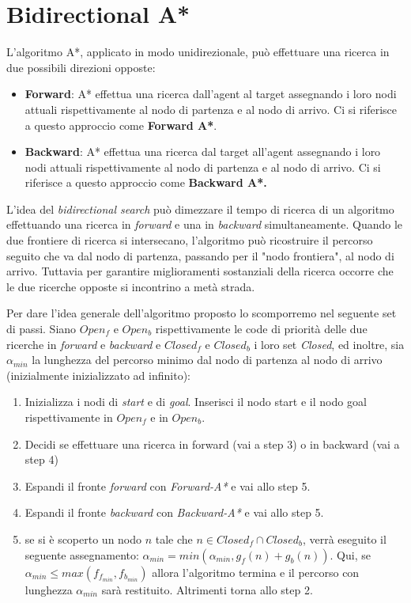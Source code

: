 \documentclass[11pt]{book}
\begin{document}
\section{Bidirectional A*}
\label{sec:bidirectional}
\par{L'algoritmo A*, applicato in modo unidirezionale, pu\`o effettuare una ricerca in due possibili direzioni opposte:
\begin{itemize}
\item \textbf{Forward}: A* effettua una ricerca dall'agent al target assegnando i loro nodi attuali rispettivamente al nodo di partenza e al nodo di arrivo. Ci si riferisce a questo approccio come \textbf{Forward A*}.
\item \textbf{Backward}: A* effettua una ricerca dal target all'agent assegnando i loro nodi attuali rispettivamente al nodo di partenza e al nodo di arrivo. Ci si riferisce a questo approccio come \textbf{Backward A*.}
\end{itemize}}
\par{
L'idea del \emph{bidirectional search} pu\`o dimezzare il tempo di ricerca di un algoritmo effettuando una ricerca in \emph{forward} e una in \emph{backward} simultaneamente. Quando le due frontiere di ricerca si intersecano, l'algoritmo pu\`o ricostruire il percorso seguito che va dal nodo di partenza, passando per il "nodo frontiera", al nodo di arrivo. Tuttavia per garantire miglioramenti sostanziali della ricerca occorre che le due ricerche opposte si incontrino a met\`a strada.}
\par{Per dare l'idea generale dell'algoritmo proposto lo scomporremo nel seguente set di passi. Siano \emph{$Open_{f}$} e \emph{$Open_{b}$} rispettivamente le code di priorit\`a delle due ricerche in \emph{forward} e \emph{backward} e \emph{$Closed_f$} e \emph{$Closed_b$} i loro set \emph{Closed}, ed inoltre, sia $\alpha_{min}$ la lunghezza del percorso minimo dal nodo di partenza al nodo di arrivo (inizialmente inizializzato ad infinito):

\begin{enumerate}
\item Inizializza i nodi di \emph{start} e di \emph{goal}. Inserisci il nodo start e il nodo goal rispettivamente in \emph{$Open_f$} e in \emph{$Open_b$}.
\item Decidi se effettuare una ricerca in forward (vai a step 3) o in backward (vai a step 4)
\item Espandi il fronte \emph{forward} con \emph{Forward-A*} e vai allo step 5.
\item Espandi il fronte \emph{backward} con \emph{Backward-A*} e vai allo step 5.
\item se si \`e scoperto un nodo $n$ tale che $n \in Closed_f \cap Closed_b$, verr\`a eseguito il seguente assegnamento:  $\alpha_{min} = min(\alpha_{min}, g_{f}(n) + g_{b}(n))$. Qui, se $\alpha_{min} \leq max(f_{f_{min}}, f_{b_{min}})$ allora l'algoritmo termina e il percorso con lunghezza $\alpha_{min}$ sar\`a restituito. 
Altrimenti torna allo step 2.
\end{enumerate}

}
\end{document}
